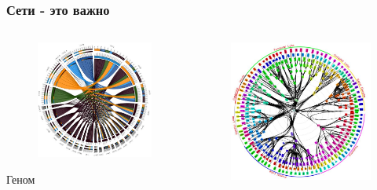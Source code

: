 \documentclass[default]{beamer}
\begin{document}
	\begin{frame}	
		\frametitle{Сети - это важно}

		\begin{columns}
			\begin{column}{0.3\textwidth}		
				\begin{figure}
					\includegraphics[width=\textwidth]{genome}
				\end{figure}
				\centering
				Геном
			\end{column}
			\begin{column}{0.3\textwidth}		
				\begin{figure}
					\includegraphics[width=\textwidth]{connectome}

\end{figure}
\end{column}
\end{columns}
\end{frame}
\end{document}
